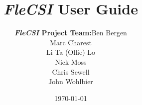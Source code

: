 
\title{\textbf{\emph{FleCSI} User Guide}}
\date{\today}
\author{\begin{tabular}{rl}
        \textbf{\emph{FleCSI} Project Team:} & Ben Bergen \\
                                     & Marc Charest \\
                                     & Li-Ta (Ollie) Lo \\
                                     & Nick Moss \\
                                     & Chris Sewell \\
                                     & John Wohlbier
        \end{tabular}}

